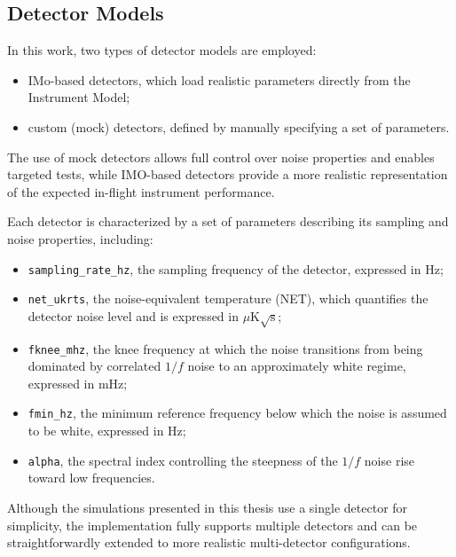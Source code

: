 \subsection{Detector Models}

In this work, two types of detector models are employed:
\begin{itemize}
    \item IMo-based detectors, which load realistic parameters directly from the Instrument Model;
    \item custom (mock) detectors, defined by manually specifying a set of parameters.
\end{itemize}

The use of mock detectors allows full control over noise properties and enables targeted tests, while IMO-based detectors provide a more realistic representation of the expected in-flight instrument performance.

Each detector is characterized by a set of parameters describing its sampling and noise properties, including:
\begin{itemize}
    \item \texttt{sampling\_rate\_hz}, the sampling frequency of the detector, expressed in Hz;

    \item \texttt{net\_ukrts}, the noise-equivalent temperature (NET), which quantifies the detector noise level and is expressed in $\mu\mathrm{K}\sqrt{\mathrm{s}}$;

    \item \texttt{fknee\_mhz}, the knee frequency at which the noise transitions from being dominated by correlated $1/f$ noise to an approximately white regime, expressed in mHz;

    \item \texttt{fmin\_hz}, the minimum reference frequency below which the noise is assumed to be white, expressed in Hz;

    \item \texttt{alpha}, the spectral index controlling the steepness of the $1/f$ noise rise toward low frequencies.
\end{itemize}

Although the simulations presented in this thesis use a single detector for simplicity, the implementation fully supports multiple detectors and can be straightforwardly extended to more realistic multi-detector configurations.



